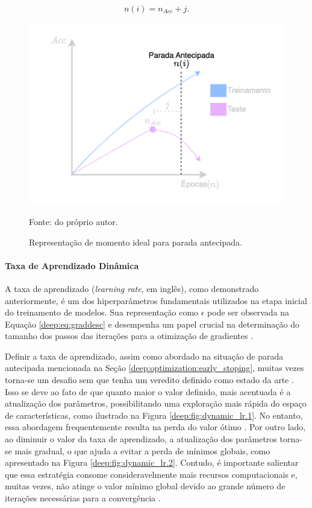 \begin{equation}
    \label{deep:eq:early_stopping}
    n(i) = n_{Acc} + j.
\end{equation}


\begin{figure}[H]
    \centering
    \caption{Representação de momento ideal para parada antecipada.}
    \includegraphics[width=0.6\linewidth]{recursos/imagens/deep/early_stopping.png}
    \label{deep:fig:earlystopping}

    Fonte: do próprio autor.
\end{figure}

\paragraph{Taxa de Aprendizado Dinâmica}
\label{deep:optimization:dynamic_lr}

A taxa de aprendizado (\textit{learning rate}, em inglês), como demonstrado anteriormente, é um dos hiperparâmetros fundamentais utilizados na etapa inicial do treinamento de modelos. Sua representação como $\epsilon$ pode ser observada na Equação \ref{deep:eq:graddesc} e desempenha um papel crucial na determinação do tamanho dos passos das iterações para a otimização de gradientes \citep{Smith2017CyclicalNetworks}.

Definir a taxa de aprendizado, assim como abordado na situação de parada antecipada mencionada na Seção \ref{deep:optimization:early_stoping}, muitas vezes torna-se um desafio sem que tenha um veredito definido como estado da arte \citep{Goodfellow2016}. Isso se deve ao fato de que quanto maior o valor definido, mais acentuada é a atualização dos parâmetros, possibilitando uma exploração mais rápida do espaço de características, como ilustrado na Figura \ref{deep:fig:dynamic_lr.1}. No entanto, essa abordagem frequentemente resulta na perda do valor ótimo \citep{Tang2021AnPump}. Por outro lado, ao diminuir o valor da taxa de aprendizado, a atualização dos parâmetros torna-se mais gradual, o que ajuda a evitar a perda de mínimos globais, como apresentado na Figura \ref{deep:fig:dynamic_lr.2}. Contudo, é importante salientar que essa estratégia consome consideravelmente mais recursos computacionais e, muitas vezes, não atinge o valor mínimo global devido ao grande número de iterações necessárias para a convergência \citep{Tang2021AnPump}.

